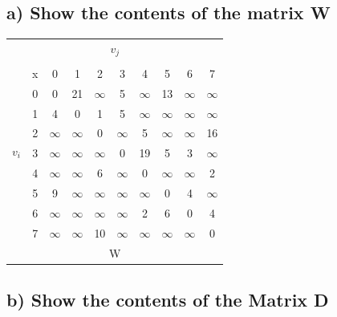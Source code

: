 \documentclass[11pt]{article}
\begin{document}
\subsection*{a) Show the contents of the matrix W}

\bigskip
\bigskip

\begin{center}
\begin{tabular} {c c | c c c c c c c c}
	\multicolumn{10}{c}{$v_j$} \\
	\multirow{10}{*}{$v_i$} \\
	& x & 0 & 1 & 2 & 3 & 4 & 5 & 6 & 7 \\
	\hline
	& 0 & 0 & 21 & $\infty$ & 5 & $\infty$ & 13 & $\infty$ & $\infty$ \\
	& 1 & 4 & 0 & 1 & 5 & $\infty$ & $\infty$ & $\infty$ & $\infty$ \\
	& 2 & $\infty$ & $\infty$ & 0 & $\infty$ & 5 & $\infty$ & $\infty$ & 16 \\
	& 3 & $\infty$ & $\infty$ & $\infty$ & 0 & 19 & 5 & 3 & $\infty$ \\
	& 4 & $\infty$ & $\infty$ & 6 & $\infty$ & 0 & $\infty$ & $\infty$ & 2 \\
	& 5 & 9 & $\infty$ & $\infty$ & $\infty$ & $\infty$ & 0 & 4 & $\infty$ \\
	& 6 & $\infty$ & $\infty$ & $\infty$ & $\infty$ & 2 & 6 & 0 & 4 \\
	& 7 & $\infty$ & $\infty$ & 10 & $\infty$ & $\infty$ & $\infty$ & $\infty$ & 0 \\[0.2cm]
	\multicolumn{10}{c}{W} \\ 
\end{tabular}
\end{center}



\subsection*{b) Show the contents of the Matrix D}

\bigskip
\bigskip
\end{document}
